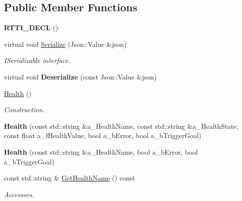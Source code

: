 \subsection*{Public Member Functions}
\begin{DoxyCompactItemize}
\item 
\mbox{\label{class_health_a2d05e69a50aa98de45b0497eebddd8f8}} 
{\bfseries R\+T\+T\+I\+\_\+\+D\+E\+CL} ()
\item 
\mbox{\label{class_health_a80c08e07b1f79985062f600992ab78a2}} 
virtual void \hyperlink{class_health_a80c08e07b1f79985062f600992ab78a2}{Serialize} (Json\+::\+Value \&json)
\begin{DoxyCompactList}\small\item\em I\+Serializable interface. \end{DoxyCompactList}\item 
\mbox{\label{class_health_afb68315c682ecd5a05e1a8c68f6391fd}} 
virtual void {\bfseries Deserialize} (const Json\+::\+Value \&json)
\item 
\mbox{\label{class_health_acd41f307cc9a942c3335480420c0ace7}} 
\hyperlink{class_health_acd41f307cc9a942c3335480420c0ace7}{Health} ()
\begin{DoxyCompactList}\small\item\em Construction. \end{DoxyCompactList}\item 
\mbox{\label{class_health_a8c140714144e6b9142ea1d95f982c7e8}} 
{\bfseries Health} (const std\+::string \&a\+\_\+\+Health\+Name, const std\+::string \&a\+\_\+\+Health\+State, const float a\+\_\+f\+Health\+Value, bool a\+\_\+b\+Error, bool a\+\_\+b\+Trigger\+Goal)
\item 
\mbox{\label{class_health_ac72804b9ebff0dff725d23bd98695bbf}} 
{\bfseries Health} (const std\+::string \&a\+\_\+\+Health\+Name, bool a\+\_\+b\+Error, bool a\+\_\+b\+Trigger\+Goal)
\item 
\mbox{\label{class_health_a41938437411f1f870b701af07da4d5d4}} 
const std\+::string \& \hyperlink{class_health_a41938437411f1f870b701af07da4d5d4}{Get\+Health\+Name} () const
\begin{DoxyCompactList}\small\item\em Accessors. \end{DoxyCompactList}\item 

\end{DoxyCompactItemize}

